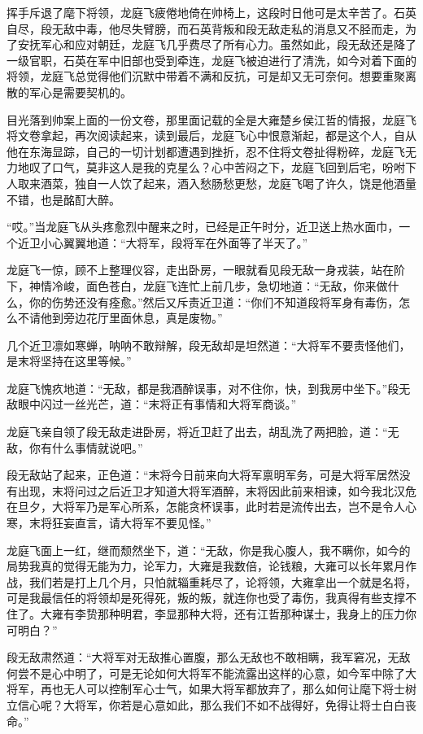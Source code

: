挥手斥退了麾下将领，龙庭飞疲倦地倚在帅椅上，这段时日他可是太辛苦了。石英自尽，段无敌中毒，他尽失臂膀，而石英背叛和段无敌走私的消息又不胫而走，为了安抚军心和应对朝廷，龙庭飞几乎费尽了所有心力。虽然如此，段无敌还是降了一级官职，石英在军中旧部也受到牵连，龙庭飞被迫进行了清洗，如今对着下面的将领，龙庭飞总觉得他们沉默中带着不满和反抗，可是却又无可奈何。想要重聚离散的军心是需要契机的。

目光落到帅案上面的一份文卷，那里面记载的全是大雍楚乡侯江哲的情报，龙庭飞将文卷拿起，再次阅读起来，读到最后，龙庭飞心中恨意渐起，都是这个人，自从他在东海显踪，自己的一切计划都遭遇到挫折，忍不住将文卷扯得粉碎，龙庭飞无力地叹了口气，莫非这人是我的克星么？心中苦闷之下，龙庭飞回到后宅，吩咐下人取来酒菜，独自一人饮了起来，酒入愁肠愁更愁，龙庭飞喝了许久，饶是他酒量不错，也是酩酊大醉。

“哎。”当龙庭飞从头疼愈烈中醒来之时，已经是正午时分，近卫送上热水面巾，一个近卫小心翼翼地道：“大将军，段将军在外面等了半天了。”

龙庭飞一惊，顾不上整理仪容，走出卧房，一眼就看见段无敌一身戎装，站在阶下，神情冷峻，面色苍白，龙庭飞连忙上前几步，急切地道：“无敌，你来做什么，你的伤势还没有痊愈。”然后又斥责近卫道：“你们不知道段将军身有毒伤，怎么不请他到旁边花厅里面休息，真是废物。”

几个近卫凛如寒蝉，呐呐不敢辩解，段无敌却是坦然道：“大将军不要责怪他们，是末将坚持在这里等候。”

龙庭飞愧疚地道：“无敌，都是我酒醉误事，对不住你，快，到我房中坐下。”段无敌眼中闪过一丝光芒，道：“末将正有事情和大将军商谈。”

龙庭飞亲自领了段无敌走进卧房，将近卫赶了出去，胡乱洗了两把脸，道：“无敌，你有什么事情就说吧。”

段无敌站了起来，正色道：“末将今日前来向大将军禀明军务，可是大将军居然没有出现，末将问过之后近卫才知道大将军酒醉，末将因此前来相谏，如今我北汉危在旦夕，大将军乃是军心所系，怎能贪杯误事，此时若是流传出去，岂不是令人心寒，末将狂妄直言，请大将军不要见怪。”

龙庭飞面上一红，继而颓然坐下，道：“无敌，你是我心腹人，我不瞒你，如今的局势我真的觉得无能为力，论军力，大雍是我数倍，论钱粮，大雍可以长年累月作战，我们若是打上几个月，只怕就辎重耗尽了，论将领，大雍拿出一个就是名将，可是我最信任的将领却是死得死，叛的叛，就连你也受了毒伤，我真得有些支撑不住了。大雍有李贽那种明君，李显那种大将，还有江哲那种谋士，我身上的压力你可明白？”

段无敌肃然道：“大将军对无敌推心置腹，那么无敌也不敢相瞒，我军窘况，无敌何尝不是心中明了，可是无论如何大将军不能流露出这样的心意，如今军中除了大将军，再也无人可以控制军心士气，如果大将军都放弃了，那么如何让麾下将士树立信心呢？大将军，你若是心意如此，那么我们不如不战得好，免得让将士白白丧命。”

